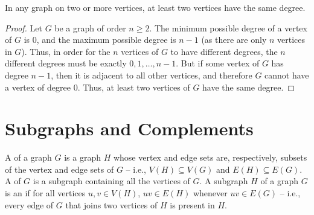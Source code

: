 \begin{Theorem}
In any graph on two or more vertices, at least two vertices have the same degree.
\end{Theorem}

\begin{proof}
Let $G$ be a graph of order $n \ge 2$. The minimum possible degree of a vertex of $G$ is $0$, and the maximum possible degree is $n - 1$ (as there are only $n$ vertices in $G$). Thus, in order for the $n$ vertices of $G$ to have different degrees, the $n$ different degrees must be exactly $0, 1, \ldots, n - 1$. But if some vertex of $G$ has degree $n - 1$, then it is adjacent to all other vertices, and therefore $G$ cannot have a vertex of degree $0$. Thus, at least two vertices of $G$ have the same degree.
\end{proof}


\section{Subgraphs and Complements}\label{sec:Subgraphs}

A  of a graph $G$ is a graph $H$ whose vertex and edge sets are, respectively, subsets of the vertex and edge sets of $G$ -- i.e., $V(H) \subseteq V(G)$ and $E(H) \subseteq E(G)$. A  of $G$ is a subgraph containing all the vertices of $G$. A subgraph $H$ of a graph $G$ is an  if for all vertices $u, v \in V(H)$, $uv \in E(H)$ whenever $uv \in E(G)$ -- i.e., every edge of $G$ that joins two vertices of $H$ is present in $H$.


